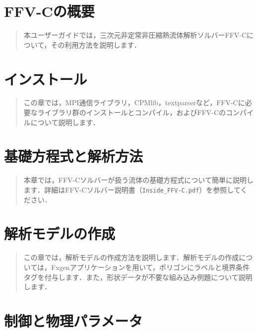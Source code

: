 \documentclass[a4paper,10pt,oneside,fleqn]{jsbook}
\begin{document}
%

\tableofcontents
%
%
\mainmatter


\chapter{FFV-Cの概要}

{\begin{abstract}
本ユーザーガイドでは，三次元非定常非圧縮熱流体解析ソルバーFFV-Cについて，その利用方法を説明します．
\end{abstract}
%




\chapter{インストール}

\begin{abstract}
この章では，MPI通信ライブラリ，CPMlib，textparserなど，FFV-Cに必要なライブラリ群のインストールとコンパイル，およびFFV-Cのコンパイルについて説明します．
\end{abstract}
%




\chapter{基礎方程式と解析方法}

\begin{abstract}
本章では，FFV-Cソルバーが扱う流体の基礎方程式について簡単に説明します．詳細はFFV-Cソルバー説明書（\verb|Inside_FFV-C.pdf|）を参照してください．
\end{abstract}
%




\chapter{解析モデルの作成}

\begin{abstract}
この章では，解析モデルの作成方法を説明します．解析モデルの作成については，Fxgenアプリケーションを用いて，ポリゴンにラベルと境界条件タグを付与します．また，形状データが不要な組み込み例題について説明します．
\end{abstract}
%




\chapter{制御と物理パラメータ}

}
\end{document}
